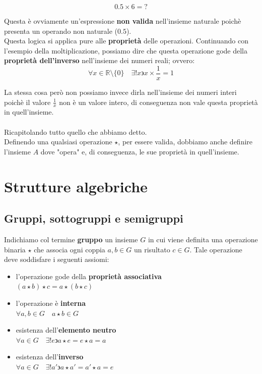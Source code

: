 \documentclass[11pt]{article}
\begin{document}
\[ 0.5 \times 6 = ?\]

Questa è ovviamente un'espressione \textbf{non valida} nell'insieme naturale poichè presenta
un operando non naturale (\(0.5\)). \\
Questa logica si applica pure alle \textbf{proprietà} delle operazioni. Continuando con l'esempio
della moltiplicazione, possiamo dire che questa operazione gode della \textbf{proprietà dell'inverso}
nell'insieme dei numeri reali; ovvero:
\[
  \forall x \in \mathbb{R} \setminus \{0\} \quad
  \exists !x \backepsilon x \times \frac{1}{x} = 1
\]

La stessa cosa però non possiamo invece dirla nell'insieme dei numeri interi poichè il 
valore \(\frac{1}{x}\) non è un valore intero, di conseguenza non vale questa proprietà in quell'insieme. \\
\\
Ricapitolando tutto quello che abbiamo detto. \\
Definendo una qualsiasi operazione \(\star\), per essere valida, dobbiamo anche definire l'insieme 
\(A\) dove "opera" e, di conseguenza, le sue proprietà in quell'insieme.

\section{Strutture algebriche}

\subsection{Gruppi, sottogruppi e semigruppi}
Indichiamo col termine \textbf{gruppo} un insieme \(G\) in cui viene definita
una operazione binaria \(\star\) che associa ogni coppia \(a,b \in G\) un risultato
\(c \in G\). Tale operazione deve soddisfare i seguenti assiomi:

\begin{itemize}

  \item 
  l'operazione gode della \textbf{proprietà associativa} \\
  \((a \star b) \star c = a \star (b \star c)\) \\

  \item 
  l'operazione è \textbf{interna} \\
  \( \forall a,b \in G \quad a \star b \in G\)

  \item
  esistenza dell'\textbf{elemento neutro} \\
  \( \forall a \in G \quad \exists!e \backepsilon a \star e = e \star a = a \) \\

  \item
  esistenza dell'\textbf{inverso} \\
  \( \forall a \in G \quad \exists!a' \backepsilon a \star a' = a' \star a = e \) \\

\end{itemize}
\end{document}
